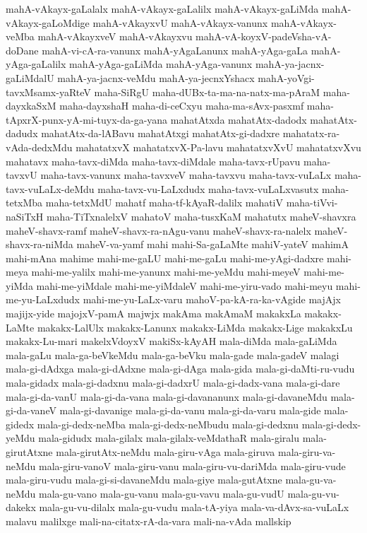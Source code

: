 {mahA-vAkayx-gaLalalx
mahA-vAkayx-gaLalilx
mahA-vAkayx-gaLiMda
mahA-vAkayx-gaLoMdige
mahA-vAkayxvU
mahA-vAkayx-vanunx
mahA-vAkayx-veMba
mahA-vAkayxveV
mahA-vAkayxvu
mahA-vA-koyxV-padeVsha-vA-doDane
mahA-vi-cA-ra-vanunx
mahA-yAgaLanunx
mahA-yAga-gaLa
mahA-yAga-gaLalilx
mahA-yAga-gaLiMda
mahA-yAga-vanunx
mahA-ya-jacnx-gaLiMdalU
mahA-ya-jacnx-veMdu
mahA-ya-jecnxYshacx
mahA-yoVgi-tavxMsamx-yaRteV
maha-SiRgU
maha-dUBx-ta-ma-na-natx-ma-pAraM
maha-dayxkaSxM
maha-dayxshaH
maha-di-ceCxyu
maha-ma-sAvx-pasxmf
maha-tApxrX-punx-yA-mi-tuyx-da-ga-yana
mahatAtxda
mahatAtx-dadodx
mahatAtx-dadudx
mahatAtx-da-lABavu
mahatAtxgi
mahatAtx-gi-dadxre
mahatatx-ra-vAda-dedxMdu
mahatatxvX
mahatatxvX-Pa-lavu
mahatatxvXvU
mahatatxvXvu
mahatavx
maha-tavx-diMda
maha-tavx-diMdale
maha-tavx-rUpavu
maha-tavxvU
maha-tavx-vanunx
maha-tavxveV
maha-tavxvu
maha-tavx-vuLaLx
maha-tavx-vuLaLx-deMdu
maha-tavx-vu-LaLxdudx
maha-tavx-vuLaLxvasutx
maha-tetxMba
maha-tetxMdU
mahatf
maha-tf-kAyaR-dalilx
mahatiV
maha-tiVvi-naSiTxH
maha-TiTxnalelxV
mahatoV
maha-tusxKaM
mahatutx
maheV-shavxra
maheV-shavx-ramf
maheV-shavx-ra-nAgu-vanu
maheV-shavx-ra-nalelx
maheV-shavx-ra-niMda
maheV-va-yamf
mahi
mahi-Sa-gaLaMte
mahiV-yateV
mahimA
mahi-mAna
mahime
mahi-me-gaLU
mahi-me-gaLu
mahi-me-yAgi-dadxre
mahi-meya
mahi-me-yalilx
mahi-me-yanunx
mahi-me-yeMdu
mahi-meyeV
mahi-me-yiMda
mahi-me-yiMdale
mahi-me-yiMdaleV
mahi-me-yiru-vado
mahi-meyu
mahi-me-yu-LaLxdudx
mahi-me-yu-LaLx-varu
mahoV-pa-kA-ra-ka-vAgide
majAjx
majijx-yide
majojxV-pamA
majwjx
makAma
makAmaM
makakxLa
makakx-LaMte
makakx-LalUlx
makakx-Lanunx
makakx-LiMda
makakx-Lige
makakxLu
makakx-Lu-mari
makelxVdoyxV
makiSx-kAyAH
mala-diMda
mala-gaLiMda
mala-gaLu
mala-ga-beVkeMdu
mala-ga-beVku
mala-gade
mala-gadeV
malagi
mala-gi-dAdxga
mala-gi-dAdxne
mala-gi-dAga
mala-gida
mala-gi-daMti-ru-vudu
mala-gidadx
mala-gi-dadxnu
mala-gi-dadxrU
mala-gi-dadx-vana
mala-gi-dare
mala-gi-da-vanU
mala-gi-da-vana
mala-gi-davananunx
mala-gi-davaneMdu
mala-gi-da-vaneV
mala-gi-davanige
mala-gi-da-vanu
mala-gi-da-varu
mala-gide
mala-gidedx
mala-gi-dedx-neMba
mala-gi-dedx-neMbudu
mala-gi-dedxnu
mala-gi-dedx-yeMdu
mala-gidudx
mala-gilalx
mala-gilalx-veMdathaR
mala-giralu
mala-girutAtxne
mala-girutAtx-neMdu
mala-giru-vAga
mala-giruva
mala-giru-va-neMdu
mala-giru-vanoV
mala-giru-vanu
mala-giru-vu-dariMda
mala-giru-vude
mala-giru-vudu
mala-gi-si-davaneMdu
mala-giye
mala-gutAtxne
mala-gu-va-neMdu
mala-gu-vano
mala-gu-vanu
mala-gu-vavu
mala-gu-vudU
mala-gu-vu-dakekx
mala-gu-vu-dilalx
mala-gu-vudu
mala-tA-yiya
mala-va-dAvx-sa-vuLaLx
malavu
malilxge
mali-na-citatx-rA-da-vara
mali-na-vAda
mallskip
}
